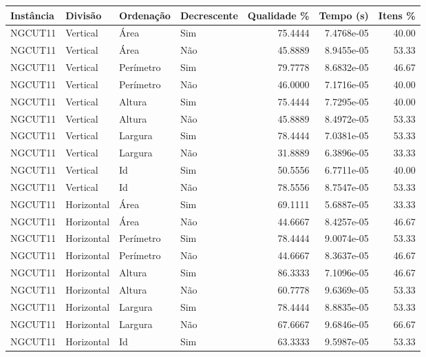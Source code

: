 \begin{tabular}{llllrrr}
\hline
Instância & Divisão     & Ordenação & Decrescente & Qualidade \% & Tempo (s)  & Itens \% \\
\hline
NGCUT11   & Vertical    & Área      & Sim         & 75.4444      & 7.4768e-05 & 40.00    \\
NGCUT11   & Vertical    & Área      & Não         & 45.8889      & 8.9455e-05 & 53.33    \\
NGCUT11   & Vertical    & Perímetro & Sim         & 79.7778      & 8.6832e-05 & 46.67    \\
NGCUT11   & Vertical    & Perímetro & Não         & 46.0000      & 7.1716e-05 & 40.00    \\
NGCUT11   & Vertical    & Altura    & Sim         & 75.4444      & 7.7295e-05 & 40.00    \\
NGCUT11   & Vertical    & Altura    & Não         & 45.8889      & 8.4972e-05 & 53.33    \\
NGCUT11   & Vertical    & Largura   & Sim         & 78.4444      & 7.0381e-05 & 53.33    \\
NGCUT11   & Vertical    & Largura   & Não         & 31.8889      & 6.3896e-05 & 33.33    \\
NGCUT11   & Vertical    & Id        & Sim         & 50.5556      & 6.7711e-05 & 40.00    \\
NGCUT11   & Vertical    & Id        & Não         & 78.5556      & 8.7547e-05 & 53.33    \\
NGCUT11   & Horizontal  & Área      & Sim         & 69.1111      & 5.6887e-05 & 33.33    \\
NGCUT11   & Horizontal  & Área      & Não         & 44.6667      & 8.4257e-05 & 46.67    \\
NGCUT11   & Horizontal  & Perímetro & Sim         & 78.4444      & 9.0074e-05 & 53.33    \\
NGCUT11   & Horizontal  & Perímetro & Não         & 44.6667      & 8.3637e-05 & 46.67    \\
NGCUT11   & Horizontal  & Altura    & Sim         & 86.3333      & 7.1096e-05 & 46.67    \\
NGCUT11   & Horizontal  & Altura    & Não         & 60.7778      & 9.6369e-05 & 53.33    \\
NGCUT11   & Horizontal  & Largura   & Sim         & 78.4444      & 8.8835e-05 & 53.33    \\
NGCUT11   & Horizontal  & Largura   & Não         & 67.6667      & 9.6846e-05 & 66.67    \\
NGCUT11   & Horizontal  & Id        & Sim         & 63.3333      & 9.5987e-05 & 53.33    \\

\end{tabular}
